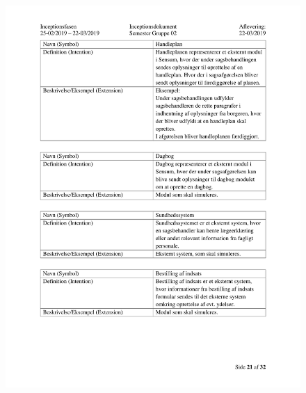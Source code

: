 \begin{figure}[hb]
  \includegraphics[scale = 0.33]{./PNG/Inceptions/Gruppe 02 + InceptionsDokument-22.jpg} 
\end{figure}

